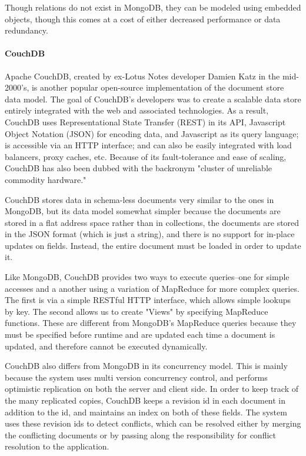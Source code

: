\documentclass[11pt,a4paper]{report}
\begin{document}
Though relations do not exist in MongoDB, they can be modeled using embedded objects, though this comes at a cost of either decreased performance or data redundancy.\cite{orend2010analysis} 

\paragraph{CouchDB}
Apache CouchDB, created by ex-Lotus Notes developer Damien Katz in the mid-2000's, is another popular open-source implementation of the document store data model.\cite{finley2012nosql} The goal of CouchDB's developers was to create a scalable data store entirely integrated with the web and associated technologies. As a result, CouchDB uses Representational State Transfer (REST) in its API, Javascript Object Notation (JSON) for encoding data, and Javascript as its query language; is  accessible via an HTTP interface; and can also be easily integrated with load balancers, proxy caches, etc. Because of its fault-tolerance and ease of scaling, CouchDB has also been dubbed with the backronym "cluster of unreliable commodity hardware."\cite{strauch2011nosql} 

CouchDB stores data in schema-less documents very similar to the ones in MongoDB, but its data model somewhat simpler because the documents are stored in a flat address space rather than in collections, the documents are stored in the JSON format (which is just a string), and there is no support for in-place updates on fields. Instead, the entire document must be loaded in order to update it.\cite{strauch2011nosql} 

Like MongoDB, CouchDB provides two ways to execute queries--one for simple accesses and a another using a variation of MapReduce for more complex queries. The first is via a simple RESTful HTTP interface, which allows simple lookups by key. The second allows us to create "Views" by specifying MapReduce functions. These are different from MongoDB's MapReduce queries because they must be specified before runtime and are updated each time a document is updated, and therefore cannot be executed dynamically.\cite{orend2010analysis}

CouchDB also differs from MongoDB in its concurrency model. This is mainly because the system uses multi version concurrency control, and performs optimistic replication on both the server and client side. In order to keep track of the many replicated copies, CouchDB keeps a revision id in each document in addition to the id, and maintains an index on both of these fields. The system uses these revision ids to detect conflicts, which can be resolved either by merging the conflicting documents or by passing along the responsibility for conflict resolution to the application. \cite{orend2010analysis} 
\end{document}
